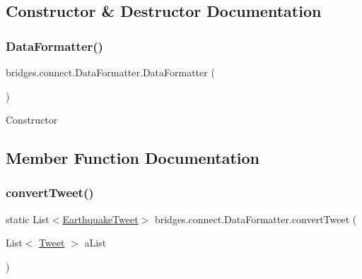 \subsection{Constructor \& Destructor Documentation}
\mbox{\label{classbridges_1_1connect_1_1_data_formatter_a31efd2251e98942e58e743dff213ef27}} 
\subsubsection{\texorpdfstring{Data\+Formatter()}{DataFormatter()}}
{\footnotesize\ttfamily bridges.\+connect.\+Data\+Formatter.\+Data\+Formatter (\begin{DoxyParamCaption}{ }\end{DoxyParamCaption})\hspace{0.3cm}{\ttfamily [protected]}}

Constructor 

\subsection{Member Function Documentation}
\mbox{\label{classbridges_1_1connect_1_1_data_formatter_ad87ca06456fa4dc110e167e84f2d4447}} 
\subsubsection{\texorpdfstring{convert\+Tweet()}{convertTweet()}}
{\footnotesize\ttfamily static List$<$\hyperlink{classbridges_1_1data__src__dependent_1_1_earthquake_tweet}{Earthquake\+Tweet}$>$ bridges.\+connect.\+Data\+Formatter.\+convert\+Tweet (\begin{DoxyParamCaption}\item[{List$<$ \hyperlink{classbridges_1_1data__src__dependent_1_1_tweet}{Tweet} $>$}]{a\+List }\end{DoxyParamCaption})\hspace{0.3cm}{\ttfamily [static]}}

